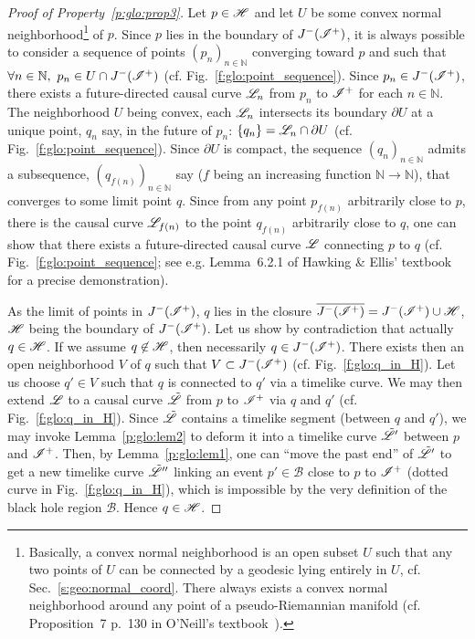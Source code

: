 \begin{proof}[Proof of Property~\ref{p:glo:prop3}]
Let $p\in\mathscr{H}$ and let $U$ be some convex normal neighborhood\footnote{Basically,
a convex normal neighborhood is an open subset $U$ such that any two points of $U$
can be connected by a geodesic lying entirely in $U$, cf. Sec.~\ref{s:geo:normal_coord}.
There always exists a convex normal neighborhood around any point of a pseudo-Riemannian manifold
(cf. Proposition~7 p.~130 in O'Neill's textbook~\cite{ONeil83}).}
of $p$. Since $p$ lies in the boundary of $J^-(\mathscr{I}^+)$, it is always possible to
consider
a sequence of points $(p_n)_{n\in\mathbb{N}}$ converging toward $p$
and such that $\forall n\in\mathbb{N},\ p_n \in U \cap J^-(\mathscr{I}^+)$
(cf. Fig.~\ref{f:glo:point_sequence}).
Since $p_n\in J^-(\mathscr{I}^+)$,
there exists a future-directed causal curve $\mathscr{L}_{n}$ from $p_n$ to $\mathscr{I}^+$
for each $n\in\mathbb{N}$.
The neighborhood $U$ being convex, each $\mathscr{L}_n$ intersects its boundary $\partial U$
at a unique point, $q_n$ say, in the future of $p_n$: $\{q_n\}=\mathscr{L}_n \cap \partial U$
(cf. Fig.~\ref{f:glo:point_sequence}).
Since $\partial U$
is compact, the sequence $(q_n)_{n\in\mathbb{N}}$ admits a subsequence,
$(q_{f(n)})_{n\in\mathbb{N}}$ say ($f$ being an increasing
function $\mathbb{N}\rightarrow\mathbb{N}$),
that converges to some limit point $q$.
Since from any point $p_{f(n)}$ arbitrarily close to $p$, there is
the causal curve $\mathscr{L}_{f(n)}$ to the point $q_{f(n)}$ arbitrarily close to $q$,
one can show that
there exists a future-directed causal curve $\mathscr{L}$ connecting $p$ to $q$
(cf. Fig.~\ref{f:glo:point_sequence}; see e.g.
Lemma~6.2.1 of Hawking \& Ellis' textbook \cite{HawkiE73}
for a precise demonstration).

As the limit of points in $J^-(\mathscr{I}^+)$, $q$ lies in the closure
$\overline{J^-(\mathscr{I}^+)} = J^-(\mathscr{I}^+) \cup \mathscr{H}$, $\mathscr{H}$
being the boundary of $J^-(\mathscr{I}^+)$.
Let us show by contradiction that actually $q\in\mathscr{H}$.
If we assume $q\not\in\mathscr{H}$, then necessarily $q\in J^-(\mathscr{I}^+)$.
There exists then an open neighborhood $V$ of $q$ such that $V \subset  J^-(\mathscr{I}^+)$
(cf. Fig.~\ref{f:glo:q_in_H}).
Let us choose $q'\in V$ such that $q$ is connected to $q'$ via a timelike curve.
We may then extend $\mathscr{L}$ to a causal curve $\tilde{\mathscr{L}}$ from $p$ to $\mathscr{I}^+$
via $q$ and $q'$ (cf. Fig.~\ref{f:glo:q_in_H}). Since $\tilde{\mathscr{L}}$ contains a timelike segment
(between $q$ and $q'$), we may invoke Lemma~\ref{p:glo:lem2} to deform it into
a timelike curve $\tilde{\mathscr{L}}'$ between $p$ and $\mathscr{I}^+$. Then, by Lemma~\ref{p:glo:lem1},
one can ``move the past end'' of $\tilde{\mathscr{L}}'$
to get a new timelike curve $\tilde{\mathscr{L}}''$ linking an event $p'\in\mathscr{B}$ close
to $p$ to $\mathscr{I}^+$ (dotted curve in Fig.~\ref{f:glo:q_in_H}), which is impossible by the very definition of the black hole
region $\mathscr{B}$. Hence $q\in\mathscr{H}$.


\end{proof}
